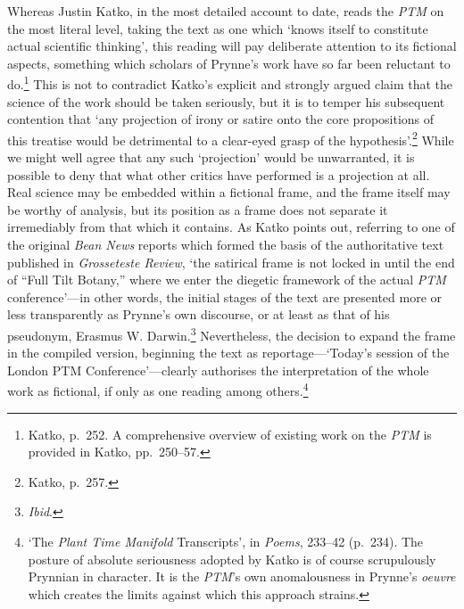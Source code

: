 \documentclass[]{article}
\begin{document}
Whereas Justin Katko, in the most detailed account to date, reads the
\emph{PTM} on the most literal level, taking the text as one which
`knows itself to constitute actual scientific thinking', this reading
will pay deliberate attention to its fictional aspects, something which
scholars of Prynne's work have so far been reluctant to do.\footnote{Katko,
  p.~252. A comprehensive overview of existing work on the \emph{PTM} is
  provided in Katko, pp.~250--57.} This is not to contradict Katko's
explicit and strongly argued claim that the science of the work should
be taken seriously, but it is to temper his subsequent contention that
`any projection of irony or satire onto the core propositions of this
treatise would be detrimental to a clear-eyed grasp of the
hypothesis'.\footnote{Katko, p.~257.} While we might well agree that any
such `projection' would be unwarranted, it is possible to deny that what
other critics have performed is a projection at all. Real science may be
embedded within a fictional frame, and the frame itself may be worthy of
analysis, but its position as a frame does not separate it irremediably
from that which it contains. As Katko points out, referring to one of
the original \emph{Bean News} reports which formed the basis of the
authoritative text published in \emph{Grosseteste Review}, `the
satirical frame is not locked in until the end of ``Full Tilt Botany,''
where we enter the diegetic framework of the actual \emph{PTM}
conference'---in other words, the initial stages of the text are
presented more or less transparently as Prynne's own discourse, or at
least as that of his pseudonym, Erasmus W. Darwin.\footnote{\emph{Ibid}.}
Nevertheless, the decision to expand the frame in the compiled version,
beginning the text as reportage---`Today's session of the London PTM
Conference'---clearly authorises the interpretation of the whole work as
fictional, if only as one reading among others.\footnote{`The
  \emph{Plant Time Manifold} Transcripts', in \emph{Poems}, 233--42
  (p.~234). The posture of absolute seriousness adopted by Katko is of
  course scrupulously Prynnian in character. It is the \emph{PTM}'s own
  anomalousness in Prynne's \emph{oeuvre} which creates the limits
  against which this approach strains.}
\end{document}
